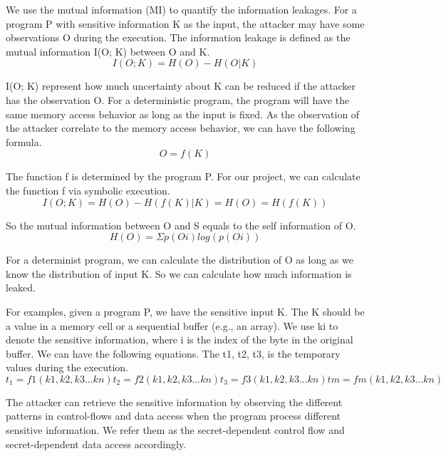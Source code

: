 We use the mutual information (MI) to quantify the information leakages. 
For a program P with sensitive information K as the input, the attacker may have some observations O during the execution. 
The information leakage is defined as the mutual information I(O; K) between O and K.
\begin{equation}
I(O; K) = H(O) - H(O|K)
\end{equation}

I(O; K) represent how much uncertainty about K can be reduced if the attacker has the observation O.
For a deterministic program, the program will have the same memory access behavior as long as the input is fixed. 
As the observation of the attacker correlate to the memory access behavior, 
we can have the following formula.
\begin{equation}
O = f(K)
\end{equation}

The function f is determined by the program P. For our project, we can calculate the function f via symbolic execution.
\begin{equation}
I(O; K) = H(O) - H(f(K)|K) = H(O) = H(f(K))
\end{equation}

So the mutual information between O and S equals to the self information of O. 
\begin{equation}
H(O) = Σp(Oi)log(p(Oi))
\end{equation}

For a determinist program, we can calculate the distribution of O as long as we know the distribution of input K. So we can calculate how much information is leaked.

For examples, given a program P, we have the sensitive input K. The K should be a value in a memory cell or a sequential buffer (e.g., an array). We use ki to denote the sensitive information, where i is the index of the byte in the original buffer.  We can have the following equations. The t1, t2, t3, is the temporary values during the execution.
\begin{equation}
t_1 = f1(k1, k2, k3 ... kn)
t_2 = f2(k1, k2, k3 ... kn)
t_3 = f3(k1, k2, k3 ... kn)
tm = fm(k1, k2, k3 ... kn)
\end{equation}

The attacker can retrieve the sensitive information by observing the different patterns in control-flows and data access when the program process different sensitive information. We refer them as the secret-dependent control flow and secret-dependent data access accordingly.

